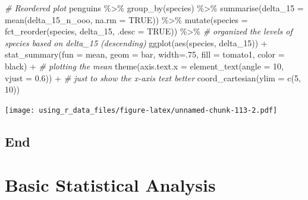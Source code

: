 \documentclass[
]{book}
\newenvironment{Shaded}{\begin{snugshade}}{\end{snugshade}}
\newcommand{\AttributeTok}[1]{\textcolor[rgb]{0.77,0.63,0.00}{#1}}
\newcommand{\CommentTok}[1]{\textcolor[rgb]{0.56,0.35,0.01}{\textit{#1}}}
\newcommand{\ConstantTok}[1]{\textcolor[rgb]{0.00,0.00,0.00}{#1}}
\newcommand{\DecValTok}[1]{\textcolor[rgb]{0.00,0.00,0.81}{#1}}
\newcommand{\FloatTok}[1]{\textcolor[rgb]{0.00,0.00,0.81}{#1}}
\newcommand{\FunctionTok}[1]{\textcolor[rgb]{0.00,0.00,0.00}{#1}}
\newcommand{\NormalTok}[1]{#1}
\newcommand{\SpecialCharTok}[1]{\textcolor[rgb]{0.00,0.00,0.00}{#1}}
\newcommand{\StringTok}[1]{\textcolor[rgb]{0.31,0.60,0.02}{#1}}
\begin{document}
\begin{Shaded}
\begin{Highlighting}[]
\CommentTok{\# Reordered plot}
\NormalTok{penguins }\SpecialCharTok{\%\textgreater{}\%} 
  \FunctionTok{group\_by}\NormalTok{(species) }\SpecialCharTok{\%\textgreater{}\%} 
  \FunctionTok{summarise}\NormalTok{(}\AttributeTok{delta\_15 =} \FunctionTok{mean}\NormalTok{(delta\_15\_n\_ooo, }\AttributeTok{na.rm =} \ConstantTok{TRUE}\NormalTok{)) }\SpecialCharTok{\%\textgreater{}\%} 
  \FunctionTok{mutate}\NormalTok{(}\AttributeTok{species =} \FunctionTok{fct\_reorder}\NormalTok{(species, delta\_15, }\AttributeTok{.desc =} \ConstantTok{TRUE}\NormalTok{)) }\SpecialCharTok{\%\textgreater{}\%}  \CommentTok{\# organized the levels of species based on delta\_15 (descending)}
  \FunctionTok{ggplot}\NormalTok{(}\FunctionTok{aes}\NormalTok{(species, delta\_15)) }\SpecialCharTok{+}
  \FunctionTok{stat\_summary}\NormalTok{(}\AttributeTok{fun =}\NormalTok{ mean, }\AttributeTok{geom =} \StringTok{\textquotesingle{}bar\textquotesingle{}}\NormalTok{, }\AttributeTok{width=}\NormalTok{.}\DecValTok{75}\NormalTok{, }\AttributeTok{fill =} \StringTok{\textquotesingle{}tomato1\textquotesingle{}}\NormalTok{, }\AttributeTok{color =} \StringTok{\textquotesingle{}black\textquotesingle{}}\NormalTok{) }\SpecialCharTok{+}  \CommentTok{\# plotting the mean}
  \FunctionTok{theme}\NormalTok{(}\AttributeTok{axis.text.x =} \FunctionTok{element\_text}\NormalTok{(}\AttributeTok{angle =} \DecValTok{10}\NormalTok{, }\AttributeTok{vjust =} \FloatTok{0.6}\NormalTok{)) }\SpecialCharTok{+} \CommentTok{\# just to show the x{-}axis text better}
  \FunctionTok{coord\_cartesian}\NormalTok{(}\AttributeTok{ylim =} \FunctionTok{c}\NormalTok{(}\DecValTok{5}\NormalTok{, }\DecValTok{10}\NormalTok{))}
\end{Highlighting}
\end{Shaded}

\texttt{[image: using\_r\_data\_files/figure-latex/unnamed-chunk-113-2.pdf]}

\hypertarget{end-1}{%
\section{End}\label{end-1}}

\hypertarget{basic-statistical-analysis}{%
\chapter{Basic Statistical Analysis}\label{basic-statistical-analysis}}
\end{document}
